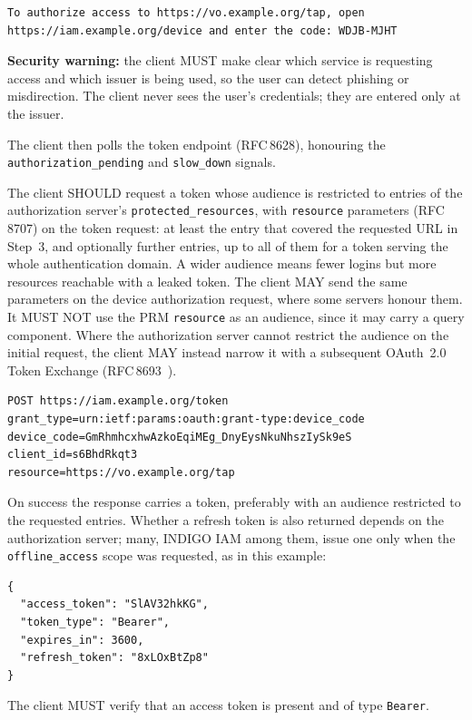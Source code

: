 \documentclass[11pt,a4paper]{ivoa}
\newcommand{\rfc}[1]{RFC\,#1}
\begin{document}
\begin{verbatim}
To authorize access to https://vo.example.org/tap, open
https://iam.example.org/device and enter the code: WDJB-MJHT
\end{verbatim}

\textbf{Security warning:} the client MUST make clear which service is
requesting access and which issuer is being used, so the user can detect
phishing or misdirection. The client never sees the user's credentials; they are
entered only at the issuer.

The client then polls the token endpoint (\rfc{8628}), honouring the
\verb|authorization_pending| and \verb|slow_down| signals.

The client SHOULD request a token whose audience is restricted to entries of
the authorization server's \verb|protected_resources|, with \verb|resource|
parameters (\rfc{8707}) on the token request: at least the entry that covered
the requested URL in Step~3, and optionally further entries, up to all of them
for a token serving the whole authentication domain. A wider audience means
fewer logins but more resources reachable with a leaked token. The client MAY
send the same parameters on the device authorization request, where some
servers honour them. It MUST NOT use the PRM \verb|resource| as an audience,
since it may carry a query component. Where the authorization server
cannot restrict the audience on the initial request, the client MAY instead
narrow it with a subsequent OAuth~2.0 Token Exchange (\rfc{8693}~\citep{std:RFC8693}).

\begin{verbatim}
POST https://iam.example.org/token
grant_type=urn:ietf:params:oauth:grant-type:device_code
device_code=GmRhmhcxhwAzkoEqiMEg_DnyEysNkuNhszIySk9eS
client_id=s6BhdRkqt3
resource=https://vo.example.org/tap
\end{verbatim}

On success the response carries a token, preferably with an audience restricted
to the requested entries. Whether a refresh token is also returned depends on the
authorization server; many, INDIGO IAM among them, issue one only when the
\verb|offline_access| scope was requested, as in this example:

\begin{verbatim}
{
  "access_token": "SlAV32hkKG",
  "token_type": "Bearer",
  "expires_in": 3600,
  "refresh_token": "8xLOxBtZp8"
}
\end{verbatim}

The client MUST verify that an access token is present and of type
\verb|Bearer|.
\end{document}
